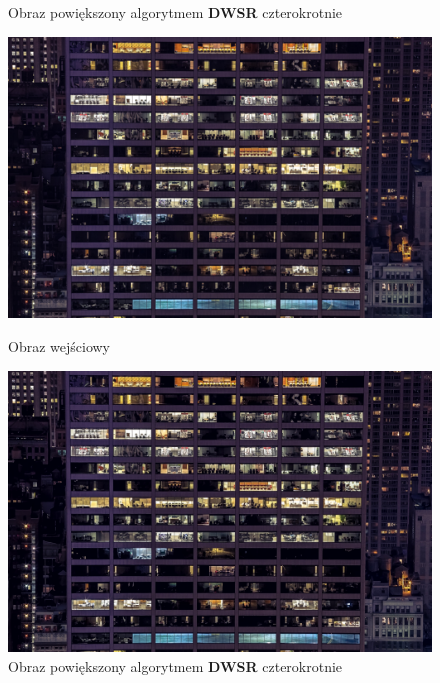 \begin{figure}[ht]
\begin{minipage}[t]{0.45\linewidth}
        \caption{Obraz powiększony algorytmem \textbf{DWSR} czterokrotnie}
        \label{fig:image51}
    \end{minipage}
\end{figure}

\begin{figure}[ht]
    \centering
    \begin{minipage}[t]{0.45\linewidth}
        \includegraphics[width=\linewidth]{Rozdziały/03.DWSR/Obrazy/0913x4.png}
        \caption{Obraz wejściowy}
        \label{fig:image52}
    \end{minipage}
    \hspace{0.5cm}
    \begin{minipage}[t]{0.45\linewidth}
        \includegraphics[width=\linewidth]{Rozdziały/03.DWSR/Obrazy/0913x4_DWSRx4.png}
        \caption{Obraz powiększony algorytmem \textbf{DWSR} czterokrotnie}
        \label{fig:image53}
    \end{minipage}
\end{figure}

